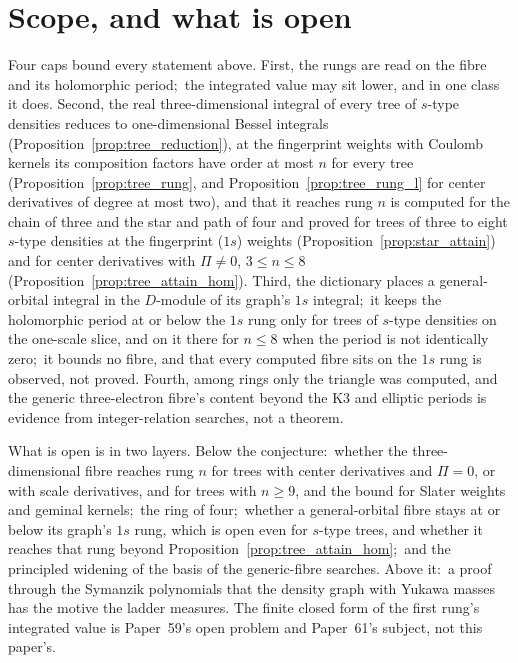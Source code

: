 \documentclass[aps,pra,twocolumn,superscriptaddress,longbibliography]{revtex4-2}
\begin{document}
\section{Scope, and what is open}
\label{sec:scope}

Four caps bound every statement above.  First, the rungs are read on the
fibre and its holomorphic period;\ the integrated value may sit lower, and
in one class it does.  Second, the real three-dimensional integral of every
tree of $s$-type densities reduces to one-dimensional Bessel integrals
(Proposition~\ref{prop:tree_reduction}), at the fingerprint weights with Coulomb
kernels its composition factors have order at most $n$ for every tree
(Proposition~\ref{prop:tree_rung}, and Proposition~\ref{prop:tree_rung_l} for center
derivatives of degree at most two), and that it reaches rung $n$ is computed
for the chain of three and the star and path of four and proved for trees of three to eight $s$-type densities at the fingerprint ($1s$) weights (Proposition~\ref{prop:star_attain}) and for center derivatives with $\Pi\neq0$, $3\le n\le8$ (Proposition~\ref{prop:tree_attain_hom}).  Third, the
dictionary places a general-orbital integral in the $D$-module of its graph's
$1s$ integral;\ it keeps the holomorphic period at or below the $1s$ rung
only for trees of $s$-type densities on the one-scale slice, and on it there
for $n\le8$ when the period is not identically zero;\ it bounds no fibre, and
that every computed fibre sits on the $1s$ rung is observed, not proved.  Fourth, among rings only the triangle was computed, and the
generic three-electron fibre's content beyond the K3 and elliptic periods is
evidence from integer-relation searches, not a theorem.

What is open is in two layers.  Below the conjecture:\ whether the
three-dimensional fibre reaches rung $n$ for trees with center derivatives and
$\Pi=0$, or with scale derivatives, and for
trees with $n\ge9$, and the bound for Slater
weights and geminal kernels;\ the ring of four;\ whether a general-orbital fibre
stays at or below its graph's $1s$ rung, which is open even for $s$-type
trees, and whether it reaches that rung beyond Proposition~\ref{prop:tree_attain_hom};\ and the principled widening of
the basis of the generic-fibre searches.  Above it:\ a proof through the Symanzik polynomials that the
density graph with Yukawa masses has the motive the ladder measures.  The
finite closed form of the first rung's integrated value is Paper~59's open
problem and Paper~61's subject, not this paper's.
\end{document}
